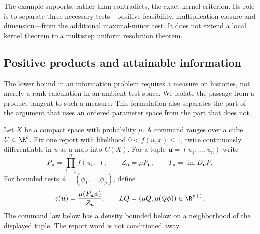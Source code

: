 The example supports, rather than contradicts, the exact-kernel
criterion. Its role is to separate three necessary tests---positive
feasibility, multiplication closure and dimension---from the additional
maximal-minor test. It does not extend a local kernel theorem to a
multistep uniform resolution theorem.


\subsection{Positive products and attainable information}
\label{sec:positive-history}
The lower bound in an information problem requires a measure on histories,
not merely a rank calculation in an ambient test space. We isolate the
passage from a product tangent to such a measure. This formulation also
separates the part of the argument that uses an ordered parameter space
from the part that does not.

Let $X$ be a compact space with probability $\mu$. A command ranges over
a cube $U\subset\R^b$. Fix one report with likelihood $0<f(u,x)\le1$, twice
continuously differentiable in $u$ as a map into $C(X)$. For a tuple
$\boldsymbol u=(u_1,\ldots,u_n)$ write
\[
 P_{\boldsymbol u}=\prod_{i=1}^nf(u_i,\cdot),\qquad
 Z_{\boldsymbol u}=\mu P_{\boldsymbol u},\qquad
 T_{\boldsymbol u}=\operatorname{im}D_{\boldsymbol u}P.
\]
For bounded tests $\phi=(\phi_1,\ldots,\phi_p)$, define
\[
 z(\boldsymbol u)=\frac{\mu(P_{\boldsymbol u}\phi)}{Z_{\boldsymbol u}},
 \qquad LQ=(\mu Q,\mu(Q\phi))\in\R^{p+1}.
\]
The command law below has a density bounded below on a neighborhood of
the displayed tuple. The report word is not conditioned away.

